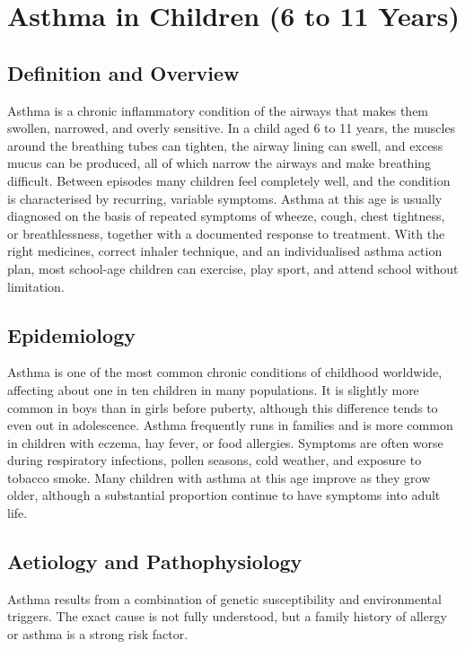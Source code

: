 \chapter{Asthma in Children (6 to 11 Years)}

\section*{Definition and Overview}
Asthma is a chronic inflammatory condition of the airways that makes them swollen, narrowed, and overly sensitive. In a child aged 6 to 11 years, the muscles around the breathing tubes can tighten, the airway lining can swell, and excess mucus can be produced, all of which narrow the airways and make breathing difficult. Between episodes many children feel completely well, and the condition is characterised by recurring, variable symptoms. Asthma at this age is usually diagnosed on the basis of repeated symptoms of wheeze, cough, chest tightness, or breathlessness, together with a documented response to treatment. With the right medicines, correct inhaler technique, and an individualised asthma action plan, most school-age children can exercise, play sport, and attend school without limitation.

\section*{Epidemiology}
Asthma is one of the most common chronic conditions of childhood worldwide, affecting about one in ten children in many populations. It is slightly more common in boys than in girls before puberty, although this difference tends to even out in adolescence. Asthma frequently runs in families and is more common in children with eczema, hay fever, or food allergies. Symptoms are often worse during respiratory infections, pollen seasons, cold weather, and exposure to tobacco smoke. Many children with asthma at this age improve as they grow older, although a substantial proportion continue to have symptoms into adult life.

\section*{Aetiology and Pathophysiology}
Asthma results from a combination of genetic susceptibility and environmental triggers. The exact cause is not fully understood, but a family history of allergy or asthma is a strong risk factor.

